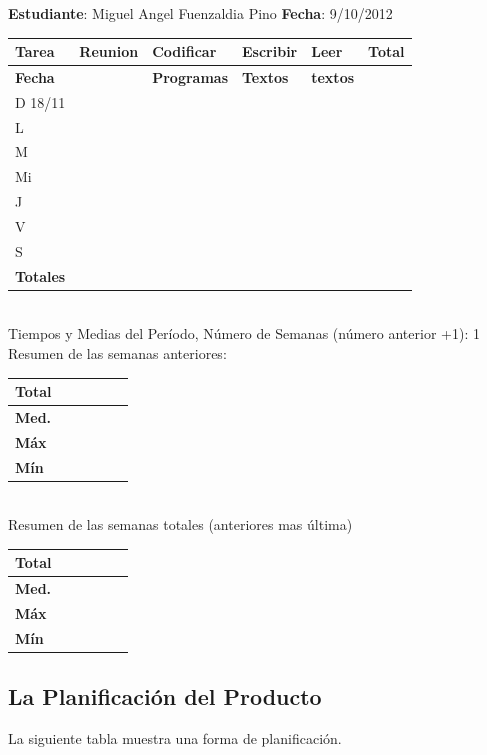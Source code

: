 \documentclass[a4paper,12pt,openany,oneside]{book}
\begin{document}
\textbf{Estudiante}: Miguel Angel Fuenzaldia Pino     \textbf{Fecha}: 9/10/2012\\
\begin{tabular}{| l | l | l | l | l | l |}
\hline
\textbf{Tarea} & \textbf{Reunion} & \textbf{Codificar} & \textbf{Escribir} & \textbf{Leer} & \textbf{Total} \\
\hline
\textbf{Fecha} &                  & \textbf{Programas} & \textbf{Textos} & \textbf{textos} & \\
\hline
D 18/11 & & & & & \\
\hline
L & & & & & \\
\hline
M & & & & & \\
\hline
Mi & & & & & \\
\hline
J & & & & & \\
\hline
V & & & & & \\
\hline
S & & & & & \\
\hline
\textbf{Totales} & & & & & \\
\hline
\end{tabular}
\\
Tiempos y Medias del Período, Número de Semanas (número anterior +1): 1\\
Resumen de las semanas anteriores:\\
\begin{tabular}{| l | l | l | l | l | l |}
\hline
\textbf{Total} & & & & & \\
\hline
\textbf{Med.} & & & & & \\
\hline
\textbf{Máx} & & & & & \\
\hline
\textbf{Mín} & & & & & \\
\hline
\end{tabular}
\\
Resumen de las semanas totales (anteriores mas última)\\
\begin{tabular}{| l | l | l | l | l | l |}
\hline
\textbf{Total} & & & & & \\
\hline
\textbf{Med.} & & & & & \\
\hline
\textbf{Máx} & & & & & \\
\hline
\textbf{Mín} & & & & & \\
\hline
\end{tabular}
\subsection{La Planificación del Producto}
La siguiente tabla muestra una forma de planificación.
\end{document}
